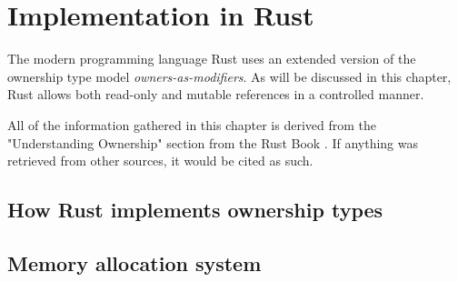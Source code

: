 \documentclass[sigplan,11pt,nonacm]{acmart}
\begin{document}



\section{Implementation in Rust}
\label{sec:implementation-in-rust}


The modern programming language Rust uses an extended version of the ownership type model \emph{owners-as-modifiers}.
As will be discussed in this chapter, Rust allows both read-only and mutable references in a controlled manner.

All of the information gathered in this chapter is derived from the "Understanding Ownership" section from the Rust Book \cite{rust-book}.
If anything was retrieved from other sources, it would be cited as such.

\subsection{How Rust implements ownership types}
\label{sec:rust-ownership-types}







\subsection{Memory allocation system}
\label{sec:memory-allocation}
\end{document}
